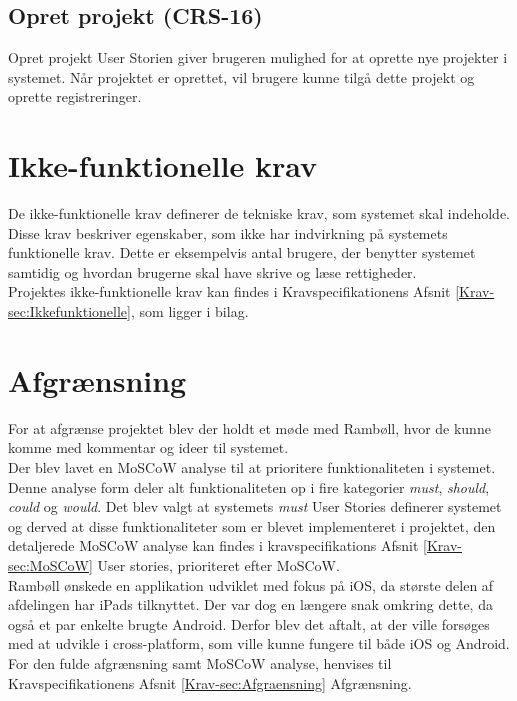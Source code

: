 	\subsection*{Opret projekt (CRS-16)}
	Opret projekt User Storien giver brugeren mulighed for at oprette nye projekter i systemet. Når projektet er oprettet, vil brugere kunne tilgå dette projekt og oprette registreringer. \\
	

\section{Ikke-funktionelle krav}
De ikke-funktionelle krav definerer de tekniske krav, som systemet skal indeholde. Disse krav beskriver egenskaber, som ikke har indvirkning på systemets funktionelle krav. Dette er eksempelvis antal brugere, der benytter systemet samtidig og hvordan brugerne skal have skrive og læse rettigheder. \\
Projektes ikke-funktionelle krav kan findes i Kravspecifikationens Afsnit \ref{Krav-sec:Ikkefunktionelle}, som ligger i bilag. \\
\section{Afgrænsning}
For at afgrænse projektet blev der holdt et møde med Rambøll, hvor de kunne komme med kommentar og ideer til systemet. \\
Der blev lavet en MoSCoW analyse til at prioritere funktionaliteten i systemet. Denne analyse form deler alt funktionaliteten op i fire kategorier \emph{must}, \emph{should}, \emph{could} og \emph{would}.
Det blev valgt at systemets \emph{must} User Stories definerer systemet og derved at disse funktionaliteter som er blevet implementeret i projektet, den detaljerede MoSCoW analyse kan findes i kravspecifikations Afsnit \ref{Krav-sec:MoSCoW} User stories, prioriteret efter MoSCoW. \\
Rambøll ønskede en applikation udviklet med fokus på iOS, da største delen af afdelingen har iPads tilknyttet. Der var dog en længere snak omkring dette, da også et par enkelte brugte Android. Derfor blev det aftalt, at der ville forsøges med at udvikle i cross-platform, som ville kunne fungere til både iOS og Android.
For den fulde afgrænsning samt MoSCoW analyse, henvises til Kravspecifikationens Afsnit \ref{Krav-sec:Afgraensning} Afgrænsning.
	